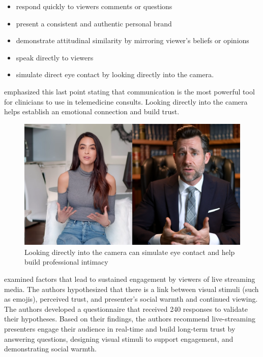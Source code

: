 \documentclass[utf8]{FrontiersinHarvard} %
\begin{document}
\begin{itemize}
\item respond quickly to viewers comments or questions
\item present a consistent and authentic personal brand
\item demonstrate attitudinal similarity by mirroring viewer's beliefs or opinions
\item speak directly to viewers
\item simulate direct eye contact by looking directly into the camera.
\end{itemize}

\citet{baroniStateArtTelerehabilitation2023} emphasized this last point stating that communication is the most powerful tool for clinicians to use in telemedicine consults. Looking directly into the camera helps establish an emotional connection and build trust.

\begin{figure}[!htbp]
\centering
\includegraphics[width=0.7\linewidth]{files/tgSYYIag2qhHH1yPOHt4-729b8b330788d4f8af93f75a0af9fc4e.png}
\caption[]{Looking directly into the camera can simulate eye contact and help build professional intimacy}
\label{bD1TUn2aPV}
\end{figure}

\citet{lvHowLiveStreaming2022} examined factors that lead to sustained engagement by viewers of live streaming media. The authors hypothesized that there is a link between visual stimuli (such as emojis), perceived trust, and presenter's social warmth and continued viewing. The authors developed a questionnaire that received 240 responses to validate their hypotheses. Based on their findings, the authors recommend live-streaming presenters engage their audience in real-time and build long-term trust by answering questions, designing visual stimuli to support engagement, and demonstrating social warmth.
\end{document}
